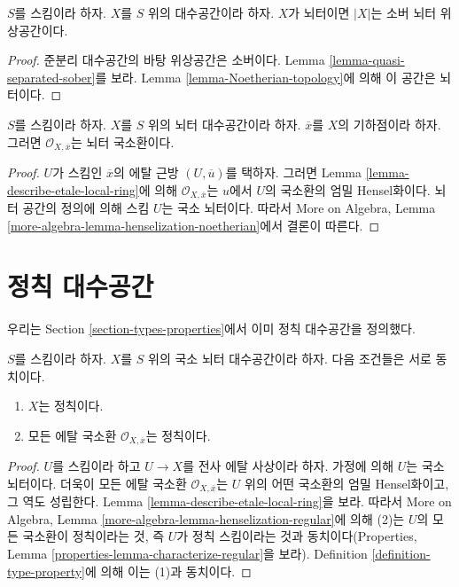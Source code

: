 \begin{lemma}
\label{lemma-Noetherian-sober}
$S$를 스킴이라 하자. $X$를 $S$ 위의 대수공간이라 하자.
$X$가 뇌터이면 $|X|$는 소버 뇌터 위상공간이다.
\end{lemma}

\begin{proof}
준분리 대수공간의 바탕 위상공간은 소버이다. Lemma
\ref{lemma-quasi-separated-sober}를 보라.
Lemma \ref{lemma-Noetherian-topology}에 의해 이 공간은 뇌터이다.
\end{proof}

\begin{lemma}
\label{lemma-Noetherian-local-ring-Noetherian}
$S$를 스킴이라 하자. $X$를 $S$ 위의 뇌터 대수공간이라 하자.
$\overline{x}$를 $X$의 기하점이라 하자. 그러면
$\mathcal{O}_{X, \overline{x}}$는 뇌터 국소환이다.
\end{lemma}

\begin{proof}
$U$가 스킴인 $\overline{x}$의 에탈 근방
$(U, \overline{u})$를 택하자. 그러면 Lemma
\ref{lemma-describe-etale-local-ring}에 의해
$\mathcal{O}_{X, \overline{x}}$는 $u$에서 $U$의 국소환의
엄밀 Hensel화이다. 뇌터 공간의 정의에 의해 스킴 $U$는
국소 뇌터이다. 따라서 More on Algebra, Lemma
\ref{more-algebra-lemma-henselization-noetherian}에서 결론이 따른다.
\end{proof}


\section{정칙 대수공간}
\label{section-regular}

\noindent
우리는 Section \ref{section-types-properties}에서 이미 정칙
대수공간을 정의했다.

\begin{lemma}
\label{lemma-regular}
$S$를 스킴이라 하자.
$X$를 $S$ 위의 국소 뇌터 대수공간이라 하자.
다음 조건들은 서로 동치이다.
\begin{enumerate}
\item $X$는 정칙이다.
\item 모든 에탈 국소환 $\mathcal{O}_{X, \overline{x}}$는 정칙이다.
\end{enumerate}
\end{lemma}

\begin{proof}
$U$를 스킴이라 하고 $U \to X$를 전사 에탈 사상이라 하자.
가정에 의해 $U$는 국소 뇌터이다. 더욱이 모든 에탈 국소환
$\mathcal{O}_{X, \overline{x}}$는 $U$ 위의 어떤 국소환의
엄밀 Hensel화이고, 그 역도 성립한다. Lemma
\ref{lemma-describe-etale-local-ring}을 보라. 따라서 More on Algebra,
Lemma \ref{more-algebra-lemma-henselization-regular}에 의해 (2)는
$U$의 모든 국소환이 정칙이라는 것, 즉 $U$가 정칙 스킴이라는 것과
동치이다(Properties, Lemma
\ref{properties-lemma-characterize-regular}을 보라).
Definition \ref{definition-type-property}에 의해 이는 (1)과 동치이다.
\end{proof}

